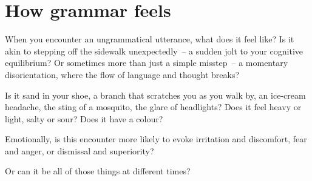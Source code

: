 \chapter{How grammar feels} \label{ch:How grammar feels}



When you encounter an ungrammatical utterance, what does it feel like? Is it akin to stepping off the sidewalk unexpectedly~-- a sudden jolt to your cognitive equilibrium? Or sometimes more than just a simple misstep~-- a momentary disorientation, where the flow of language and thought breaks?

Is it sand in your shoe, a branch that scratches you as you walk by, an ice-cream headache, the sting of a mosquito, the glare of headlights? Does it feel heavy or light, salty or sour? Does it have a colour?


Emotionally, is this encounter more likely to evoke irritation and discomfort, fear and anger, or dismissal and superiority?

Or can it be all of those things at different times?


